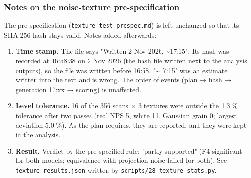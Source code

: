 \subsubsection*{Notes on the noise-texture pre-specification}
The pre-specification (\texttt{texture\_test\_prespec.md}) is left unchanged so that its SHA-256 hash stays valid. Notes added afterwards:

\begin{enumerate}
\item \textbf{Time stamp.} The file says "Written 2 Nov 2026, \textasciitilde{}17:15". Its hash was recorded at 16:58:38 on 2 Nov 2026 (the hash file written next to the analysis outputs), so the file was written before 16:58. "\textasciitilde{}17:15" was an estimate written into the text and is wrong. The order of events (plan → hash → generation 17:xx → scoring) is unaffected.
\item \textbf{Level tolerance.} 16 of the 356 scans × 3 textures were outside the ±3 \% tolerance after two passes (real NPS 5, white 11, Gaussian grain 0; largest deviation 5.0 \%). As the plan requires, they are reported, and they were kept in the analysis.
\item \textbf{Result.} Verdict by the pre-specified rule: "partly supported" (F4 significant for both models; equivalence with projection noise failed for both). See \texttt{texture\_results.json} written by \texttt{scripts/28\_texture\_stats.py}.
\end{enumerate}

